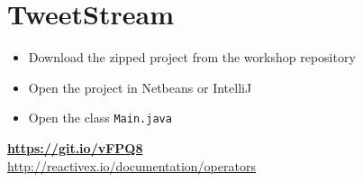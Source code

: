 \section{TweetStream}\label{sec:tweetstream}

\begin{frame}
	\centering
    \LARGE
    {}
\end{frame}

\begin{frame}{{}}
	\begin{itemize}
		\item Download the zipped project from the workshop repository
        \item Open the project in Netbeans or IntelliJ
        \item Open the class \texttt{Main.java}
	\end{itemize}
    \medskip
    \centering
    \LARGE
    \textbf{\url{https://git.io/vFPQ8}}\\
    \normalsize
    \bigskip
    \url{http://reactivex.io/documentation/operators}
\end{frame}
